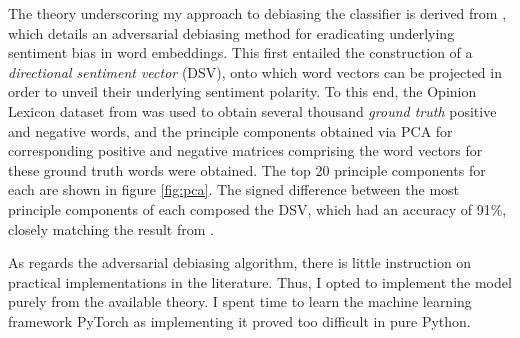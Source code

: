 \documentclass[a4paper]{IEEEtran}
\begin{document}
The theory underscoring my approach to debiasing the classifier is derived from \cite{b6}, which details an adversarial debiasing method for eradicating underlying sentiment bias in word embeddings. This first entailed the construction of a \textit{directional sentiment vector} (DSV), onto which word vectors can be projected in order to unveil their underlying sentiment polarity. To this end, the Opinion Lexicon dataset from \cite{lexicon} was used to obtain several thousand \textit{ground truth} positive and negative words, and the principle components obtained via PCA for corresponding positive and negative matrices comprising the word vectors for these ground truth words were obtained. The top 20 principle components for each are shown in figure \ref{fig:pca}. The signed difference between the most principle components of each composed the DSV, which had an accuracy of 91\%, closely matching the result from \cite{b6}. %

As regards the adversarial debiasing algorithm, there is little instruction on practical implementations in the literature. Thus, I opted to implement the model purely from the available theory. I spent time to learn the machine learning framework PyTorch \cite{pytorch} as implementing it proved too difficult in pure Python. 
\end{document}
